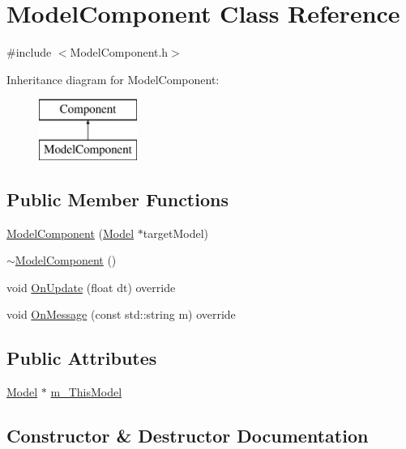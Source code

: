 \hypertarget{class_model_component}{}\section{Model\+Component Class Reference}
\label{class_model_component}


{\ttfamily \#include $<$Model\+Component.\+h$>$}

Inheritance diagram for Model\+Component\+:\begin{figure}[H]
\begin{center}
\leavevmode
\includegraphics[height=2.000000cm]{class_model_component}
\end{center}
\end{figure}
\subsection*{Public Member Functions}
\begin{DoxyCompactItemize}
\item 
\mbox{\hyperlink{class_model_component_a17f51d0e24fedfc6e7dd3633046665e4}{Model\+Component}} (\mbox{\hyperlink{class_model}{Model}} $\ast$target\+Model)
\item 
\mbox{\hyperlink{class_model_component_a6d490d6a2fdf66ad13ed8adcc39ec611}{$\sim$\+Model\+Component}} ()
\item 
void \mbox{\hyperlink{class_model_component_a5def59776319943854fb5da3dc515051}{On\+Update}} (float dt) override
\item 
void \mbox{\hyperlink{class_model_component_a48d6170e857f323839039ce54e9418e1}{On\+Message}} (const std\+::string m) override
\end{DoxyCompactItemize}
\subsection*{Public Attributes}
\begin{DoxyCompactItemize}
\item 
\mbox{\hyperlink{class_model}{Model}} $\ast$ \mbox{\hyperlink{class_model_component_afff2101b1cdbf6a8339fa151bcc8b6e0}{m\+\_\+\+This\+Model}}
\end{DoxyCompactItemize}


\subsection{Constructor \& Destructor Documentation}
\mbox{\label{class_model_component_a17f51d0e24fedfc6e7dd3633046665e4}} 
